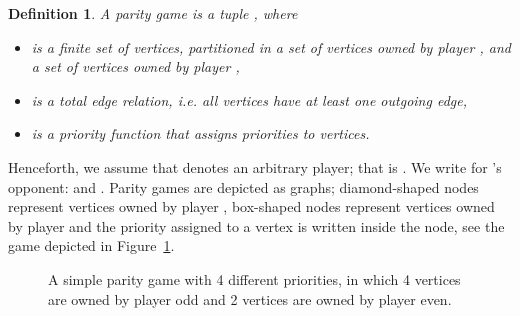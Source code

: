 \documentclass{eptcs}
\newtheorem{defi}{Definition}
\newenvironment{definition}{\begin{defi} \rm }{\end{defi}}
\newcommand{\ie}{\emph{i.e.}\xspace}
\begin{document}
\begin{definition}
A parity game is a tuple , where
\begin{itemize}
\item  is a finite set of vertices, partitioned in a set  of
vertices owned by player , and a set of vertices  
owned by player ,
\item  is a total edge relation, \ie all vertices
have at least one outgoing edge,
\item  is a priority function that assigns
priorities to vertices.
\end{itemize}
\end{definition}
Henceforth, we assume that  denotes an arbitrary
player; that is . We write  for
's opponent:   and .
Parity games are depicted as graphs; diamond-shaped nodes
represent vertices owned by player , box-shaped nodes
represent vertices owned by player  and the priority assigned
to a vertex is written inside the node, see the game depicted in
Figure~\ref{fig:example}.
\begin{figure}[h!]
\centering
{}
\caption{A simple parity game with 4 different priorities, in which 4 vertices are 
owned by player odd and 2 vertices are owned by player even.}
\label{fig:example}
\end{figure}
\end{document}
